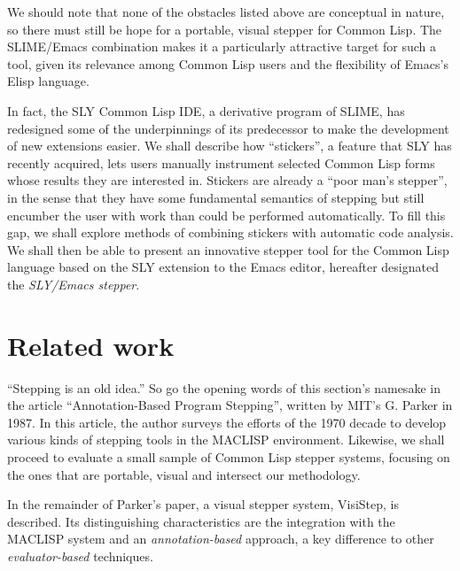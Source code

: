 \documentclass[format=sigconf]{acmart}
\begin{document}
We should note that none of the obstacles listed above are conceptual
in nature, so there must still be hope for a portable, visual stepper
for Common Lisp. The SLIME/Emacs combination makes it a particularly
attractive target for such a tool, given its relevance among Common
Lisp users and the flexibility of Emacs's Elisp language.

In fact, the SLY Common Lisp IDE\cite{sly}, a derivative program of
SLIME, has redesigned some of the underpinnings of its predecessor to
make the development of new extensions easier.  We shall describe how
``stickers'', a feature that SLY has recently acquired, lets users
manually instrument selected Common Lisp forms whose results they are
interested in.  Stickers are already a ``poor man's stepper'', in the
sense that they have some fundamental semantics of stepping but still
encumber the user with work than could be performed automatically.  To
fill this gap, we shall explore methods of combining stickers with
automatic code analysis.  We shall then be able to present an
innovative stepper tool for the Common Lisp language based on the SLY
extension to the Emacs editor, hereafter designated the
\emph{SLY/Emacs stepper}.

\section{Related work}

``Stepping is an old idea.''  So go the opening words of this
section's namesake in the article ``Annotation-Based Program
Stepping'', written by MIT's G. Parker in 1987\cite{annotation-based}.
In this article, the author surveys the efforts of the 1970 decade to
develop various kinds of stepping tools in the MACLISP environment.
Likewise, we shall proceed to evaluate a small sample of Common Lisp
stepper systems, focusing on the ones that are portable, visual and
intersect our methodology.

In the remainder of Parker's paper\cite{annotation-based}, a
visual stepper system, VisiStep, is described.  Its distinguishing
characteristics are the integration with the MACLISP system and an
\emph{annotation-based} approach, a key difference to other
\emph{evaluator-based} techniques.
\end{document}
